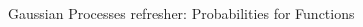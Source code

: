 \documentclass[final,t]{beamer}\usepackage[]{graphicx}\usepackage[]{color}
\newenvironment{knitrout}{}{} %
\begin{document}
\begin{frame}[fragile]
\begin{block}{Gaussian Processes refresher: Probabilities for Functions}
\begin{columns}[T]
\begin{column}{0.28\linewidth}
\begin{knitrout}
\end{knitrout}

      \end{column}
    \end{columns}
  \end{block}
\end{frame}
\end{document}
